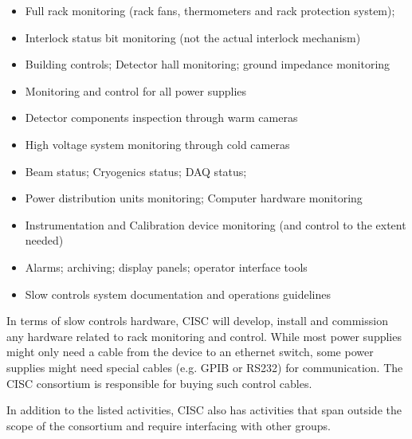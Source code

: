 \begin{itemize}
\item
  Full rack monitoring (rack fans, thermometers and rack protection
  system); 
\item
  Interlock status bit monitoring (not the actual interlock mechanism)
\item
  Building controls; Detector hall monitoring; ground impedance
  monitoring
\item
  Monitoring and control for all power supplies
\item
  Detector components inspection through warm cameras
\item
  High voltage system monitoring through cold cameras
\item
  Beam status; Cryogenics status; DAQ status; 
\item
  Power distribution units monitoring; Computer hardware monitoring
\item
  Instrumentation and Calibration device monitoring (and control to the
  extent needed)
\item
  Alarms; archiving; display panels; operator interface tools 
\item
  Slow controls system documentation and operations guidelines
\end{itemize}

In terms of slow controls hardware, CISC will develop, install and
commission any hardware related to rack monitoring and control. While
most power supplies might only need a cable from the device to an
ethernet switch, some power supplies might need special cables (e.g.
GPIB or RS232) for communication. The CISC consortium is responsible for
buying such control cables.

In addition to the listed activities, CISC also has activities that span
outside the scope of the consortium and require interfacing with other
groups.

